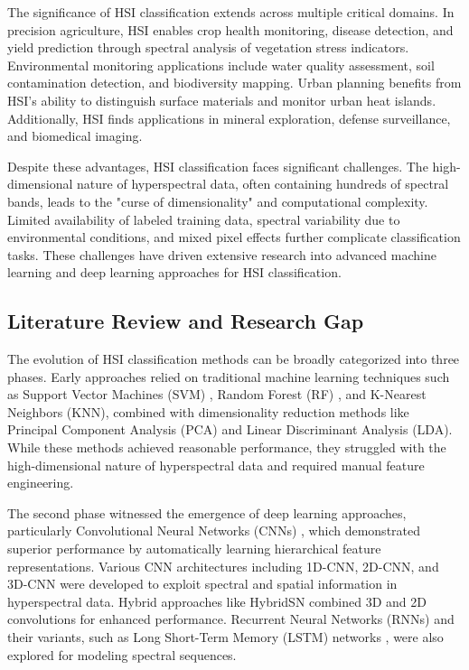 \documentclass[journal]{IEEEtran}
\begin{document}
The significance of HSI classification extends across multiple critical domains. In precision agriculture, HSI enables crop health monitoring, disease detection, and yield prediction through spectral analysis of vegetation stress indicators. Environmental monitoring applications include water quality assessment, soil contamination detection, and biodiversity mapping. Urban planning benefits from HSI's ability to distinguish surface materials and monitor urban heat islands. Additionally, HSI finds applications in mineral exploration, defense surveillance, and biomedical imaging.

Despite these advantages, HSI classification faces significant challenges. The high-dimensional nature of hyperspectral data, often containing hundreds of spectral bands, leads to the "curse of dimensionality" and computational complexity. Limited availability of labeled training data, spectral variability due to environmental conditions, and mixed pixel effects further complicate classification tasks. These challenges have driven extensive research into advanced machine learning and deep learning approaches for HSI classification.

\subsection{Literature Review and Research Gap}

The evolution of HSI classification methods can be broadly categorized into three phases. Early approaches relied on traditional machine learning techniques such as Support Vector Machines (SVM) \cite{melgani2004classification}, Random Forest (RF) \cite{gislason2006random}, and K-Nearest Neighbors (KNN), combined with dimensionality reduction methods like Principal Component Analysis (PCA) \cite{green1988transformation} and Linear Discriminant Analysis (LDA). While these methods achieved reasonable performance, they struggled with the high-dimensional nature of hyperspectral data and required manual feature engineering.

The second phase witnessed the emergence of deep learning approaches, particularly Convolutional Neural Networks (CNNs) \cite{chen2019deep}, which demonstrated superior performance by automatically learning hierarchical feature representations. Various CNN architectures including 1D-CNN, 2D-CNN, and 3D-CNN \cite{zhong2019spectral} were developed to exploit spectral and spatial information in hyperspectral data. Hybrid approaches like HybridSN \cite{roy2020hybridsn} combined 3D and 2D convolutions for enhanced performance. Recurrent Neural Networks (RNNs) \cite{mou2019deep} and their variants, such as Long Short-Term Memory (LSTM) networks \cite{liu2020bidirectional}, were also explored for modeling spectral sequences.
\end{document}
